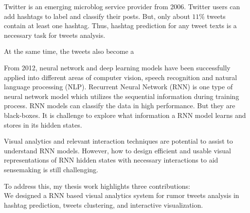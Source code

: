 
Twitter is an emerging microblog service provider from 2006. Twitter users can add hashtags to label and classify their posts. But, only about $11\%$ tweets contain at least one hashtag. Thus, hashtag prediction for any tweet texts is a necessary task for tweets analysis. 

At the same time, the tweets also become a 

 From 2012, neural network and deep learning models have been successfully applied into different areas of computer vision, speech recognition and natural language processing (NLP). Recurrent Neural Network (RNN) is one type of neural network model which utilizes the sequential information during training process. RNN models can classify the data in high performance. But they are black-boxes. It is challenge to explore what information a RNN model learns and stores in its hidden states.  
 
 Visual analytics and relevant interaction techniques are potential to assist to understand RNN models. However, how to design efficient and usable visual representations of RNN hidden states with necessary interactions to aid sensemaking is still challenging.

To address this, my thesis work highlights three contributions: \\

 We designed a RNN based visual analytics system for rumor tweets analysis in hashtag prediction, tweets clustering, and interactive visualization.\\





